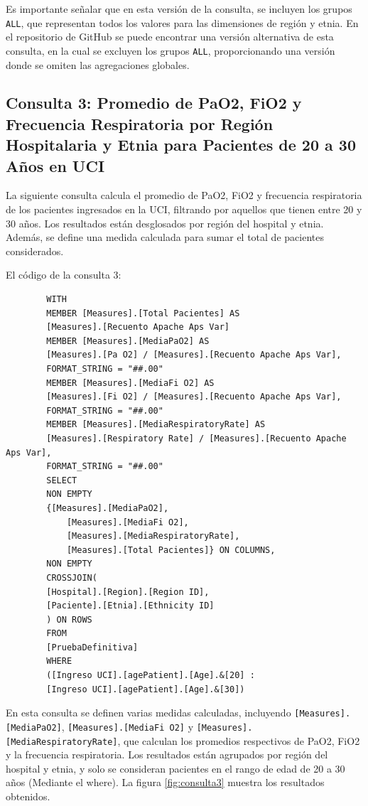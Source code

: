 \documentclass[12pt, a4paper, twoside]{article}
\begin{document}
	Es importante señalar que en esta versión de la consulta, se incluyen los grupos \texttt{ALL}, que representan todos los valores para las dimensiones de región y etnia. En el repositorio de GitHub se puede encontrar una versión alternativa de esta consulta, en la cual se excluyen los grupos \texttt{ALL}, proporcionando una versión donde se omiten las agregaciones globales.
	
	\subsection{Consulta 3: Promedio de PaO2, FiO2 y Frecuencia Respiratoria por Región Hospitalaria y Etnia para Pacientes de 20 a 30 Años en UCI}
	
	La siguiente consulta calcula el promedio de PaO2, FiO2 y frecuencia respiratoria de los pacientes ingresados en la UCI, filtrando por aquellos que tienen entre 20 y 30 años. Los resultados están desglosados por región del hospital y etnia. Además, se define una medida calculada para sumar el total de pacientes considerados.
	
	El código de la consulta 3:
	
	\begin{verbatim}
		WITH 
		MEMBER [Measures].[Total Pacientes] AS
		[Measures].[Recuento Apache Aps Var]
		MEMBER [Measures].[MediaPaO2] AS
		[Measures].[Pa O2] / [Measures].[Recuento Apache Aps Var],
		FORMAT_STRING = "##.00"
		MEMBER [Measures].[MediaFi O2] AS
		[Measures].[Fi O2] / [Measures].[Recuento Apache Aps Var],
		FORMAT_STRING = "##.00"
		MEMBER [Measures].[MediaRespiratoryRate] AS
		[Measures].[Respiratory Rate] / [Measures].[Recuento Apache Aps Var],
		FORMAT_STRING = "##.00"
		SELECT
		NON EMPTY 
		{[Measures].[MediaPaO2], 
			[Measures].[MediaFi O2],
			[Measures].[MediaRespiratoryRate],
			[Measures].[Total Pacientes]} ON COLUMNS,
		NON EMPTY 
		CROSSJOIN(
		[Hospital].[Region].[Region ID], 
		[Paciente].[Etnia].[Ethnicity ID]
		) ON ROWS
		FROM 
		[PruebaDefinitiva]
		WHERE
		([Ingreso UCI].[agePatient].[Age].&[20] : 
		[Ingreso UCI].[agePatient].[Age].&[30])
	\end{verbatim}
	
	En esta consulta se definen varias medidas calculadas, incluyendo \texttt{[Measures].[MediaPaO2]}, \texttt{[Measures].[MediaFi O2]} y \texttt{[Measures].[MediaRespiratoryRate]}, que calculan los promedios respectivos de PaO2, FiO2 y la frecuencia respiratoria. Los resultados están agrupados por región del hospital y etnia, y solo se consideran pacientes en el rango de edad de 20 a 30 años (Mediante el where). La figura \ref{fig:consulta3} muestra los resultados obtenidos.
	
\end{document}
